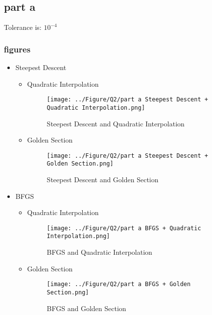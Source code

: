 \subsection{part a}
Tolerance is: $10^{-4}$
\subsubsection{figures}
\newpage
\begin{itemize}
	\item Steepest Descent
	\begin{itemize}
		\item Quadratic Interpolation
		\begin{figure}[H]
			\caption{Steepest Descent and Quadratic Interpolation}
			\centering
			\texttt{[image: ../Figure/Q2/part a Steepest Descent + Quadratic Interpolation.png]}
		\end{figure}
		\item Golden Section
		\begin{figure}[H]
			\caption{Steepest Descent and Golden Section}
			\centering
			\texttt{[image: ../Figure/Q2/part a Steepest Descent + Golden Section.png]}
		\end{figure}
	\end{itemize}
	\item BFGS
	\begin{itemize}
		\item Quadratic Interpolation
		\begin{figure}[H]
			\caption{BFGS and Quadratic Interpolation}
			\centering
			\texttt{[image: ../Figure/Q2/part a BFGS + Quadratic Interpolation.png]}
		\end{figure}
		\item Golden Section
		\begin{figure}[H]
			\caption{BFGS and Golden Section}
			\centering
			\texttt{[image: ../Figure/Q2/part a BFGS + Golden Section.png]}
		\end{figure}
	\end{itemize}
\end{itemize}
